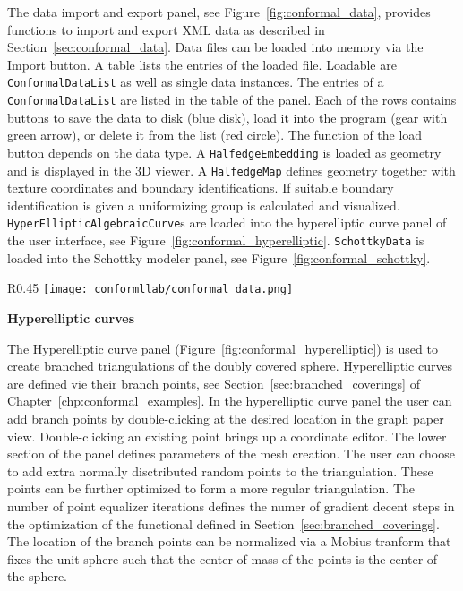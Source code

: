\documentclass[Thesis.tex]{subfiles}
\begin{document}
The data import and export panel, see Figure~\ref{fig:conformal_data}, provides
functions to import and export XML data as described in
Section~\ref{sec:conformal_data}.  Data files can be loaded into memory via the
Import button. A table lists the entries of the loaded file.  Loadable are {\tt
ConformalDataList} as well as single data instances. The entries of a {\tt
ConformalDataList} are listed in the table of the panel. Each of the rows
contains buttons to save the data to disk (blue disk), load it into the program
(gear with green arrow), or delete it from the list (red circle).  The function
of the load button depends on the data type. A {\tt HalfedgeEmbedding} is
loaded as geometry and is displayed in the 3D viewer. A {\tt HalfedgeMap}
defines geometry together with texture coordinates and boundary
identifications. If suitable boundary identification is given a uniformizing
group is calculated and visualized. {\tt HyperEllipticAlgebraicCurve}s are
loaded into the hyperelliptic curve panel of the user interface, see
Figure~\ref{fig:conformal_hyperelliptic}.  {\tt SchottkyData} is loaded into
the Schottky modeler panel, see Figure~\ref{fig:conformal_schottky}.

\begin{wrapfigure}{R}{0.45\textwidth}
\centering
\texttt{[image: conformllab/conformal\_data.png]}
\caption{XML data import and export interface of {\sc ConformalLab}.}
\label{fig:conformal_data}
\end{wrapfigure}

{\bf Hyperelliptic curves}

The Hyperelliptic curve panel (Figure~\ref{fig:conformal_hyperelliptic}) is
used to create branched triangulations of the doubly covered sphere.
Hyperelliptic curves are defined vie their branch points, see
Section~\ref{sec:branched_coverings} of Chapter~\ref{chp:conformal_examples}.
In the hyperelliptic curve panel the user can add branch points by
double-clicking at the desired location in the graph paper view.
Double-clicking an existing point brings up a coordinate editor. The lower
section of the panel defines parameters of the mesh creation. The user can
choose to add extra normally disctributed random points to the triangulation.
These points can be further optimized to form a more regular triangulation.
The number of point equalizer iterations defines the numer of gradient decent
steps in the optimization of the functional defined in
Section~\ref{sec:branched_coverings}.  The location of the branch points can be
normalized via a Mobius tranform that fixes the unit sphere such that the
center of mass of the points is the center of the sphere.
\end{document}
